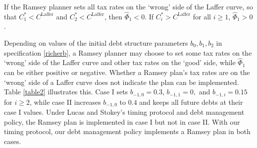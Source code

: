\documentclass[12pt]{article}
\begin{document}
If the Ramsey planner  sets all  tax rates on the `wrong' side of the Laffer curve, so that $C_1^*<C^{\text{Laffer}}$ and $C_2^*<C^{\text{Laffer}}$, then $\widehat\Phi_1 <0$. If  $C_i^*>C^{\text{Laffer}}$ for all $i\geq 1$,  $\widehat\Phi_1 >0$. %

Depending on  values of the initial debt structure parameters $b_0, b_1, b_2$ in specification \eqref{richerb},  a Ramsey planner may choose to  set some tax rates on the `wrong' side of the Laffer curve and other tax rates  on the `good' side, while  $\widehat\Phi_1$ can  be  either positive or negative. Whether a  Ramsey plan's tax rates are  on the `wrong' side of 
a Laffer curve  does not indicate  the plan can be implemented. %
{Table \ref{table2}} illustrates this.  Case I sets $b_{-1, 0}=0.3$, $b_{-1, 1}=0,$ and $b_{-1, i}=0.15$ for $i\geq 2$, while 
case II  increases $b_{-1, 0}$ to $0.4$ and keeps all future debts at their case I values. %
Under  Lucas and  Stokey's timing protocol and debt management policy, the Ramsey plan is implemented  in case I  but not  in case II. With our timing protocol, our debt management
policy implements a Ramsey plan  in both cases. 
\end{document}
